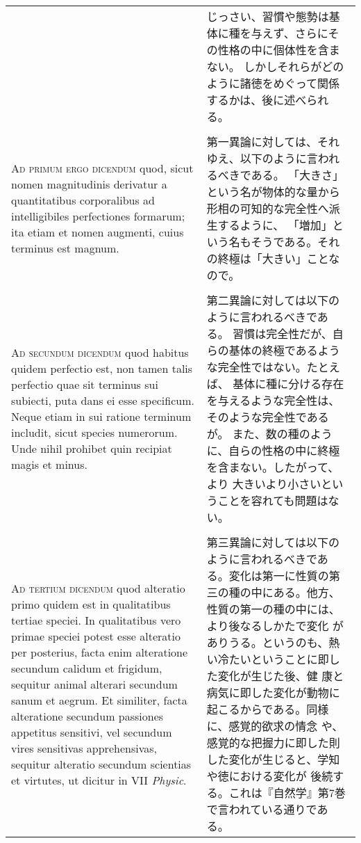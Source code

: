 \documentclass[10pt]{jsarticle} %
\begin{document}
\begin{longtable}{p{21em}p{21em}}
&

じっさい、習慣や態勢は基体に種を与えず、さらにその性格の中に個体性を含まない。
しかしそれらがどのように諸徳をめぐって関係するかは、後に述べられる。

\\\\


{\scshape Ad primum ergo dicendum} quod, sicut nomen magnitudinis derivatur a
quantitatibus corporalibus ad intelligibiles perfectiones formarum;
ita etiam et nomen augmenti, cuius terminus est magnum.

&

第一異論に対しては、それゆえ、以下のように言われるべきである。
「大きさ」という名が物体的な量から形相の可知的な完全性へ派生するように、
 「増加」という名もそうである。それの終極は「大きい」ことなので。

\\\\


{\scshape Ad secundum dicendum} quod habitus quidem perfectio est, non tamen
talis perfectio quae sit terminus sui subiecti, puta dans ei esse
specificum. Neque etiam in sui ratione terminum includit, sicut
species numerorum. Unde nihil prohibet quin recipiat magis et minus.

&

第二異論に対しては以下のように言われるべきである。
習慣は完全性だが、自らの基体の終極であるような完全性ではない。たとえば、
 基体に種に分ける存在を与えるような完全性は、そのような完全性であるが。
また、数の種のように、自らの性格の中に終極を含まない。したがって、より
 大きいより小さいということを容れても問題はない。

\\\\


{\scshape Ad tertium dicendum} quod alteratio primo quidem est in qualitatibus
tertiae speciei. In qualitatibus vero primae speciei potest esse
alteratio per posterius, facta enim alteratione secundum calidum et
frigidum, sequitur animal alterari secundum sanum et aegrum. Et
similiter, facta alteratione secundum passiones appetitus sensitivi,
vel secundum vires sensitivas apprehensivas, sequitur alteratio
secundum scientias et virtutes, ut dicitur in VII {\itshape Physic}.
&

第三異論に対しては以下のように言われるべきである。変化は第一に性質の第
三の種の中にある。他方、性質の第一の種の中には、より後なるしかたで変化
がありうる。というのも、熱い冷たいということに即した変化が生じた後、健
康と病気に即した変化が動物に起こるからである。同様に、感覚的欲求の情念
や、感覚的な把握力に即した則した変化が生じると、学知や徳における変化が
後続する。これは『自然学』第7巻で言われている通りである。


\end{longtable}
\newpage
\end{document}
